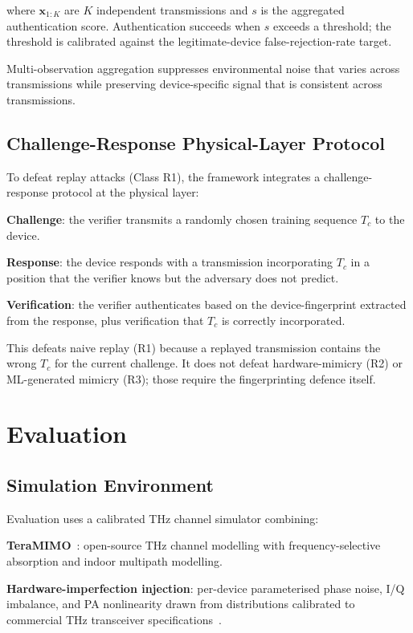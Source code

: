 \documentclass[sigconf,nonacm]{acmart}
\begin{document}
where $\mathbf{x}_{1:K}$ are $K$ independent transmissions and
$s$ is the aggregated authentication score. Authentication
succeeds when $s$ exceeds a threshold; the threshold is calibrated
against the legitimate-device false-rejection-rate target.

Multi-observation aggregation suppresses environmental noise that
varies across transmissions while preserving device-specific signal
that is consistent across transmissions.

\subsection{Challenge-Response Physical-Layer Protocol}

To defeat replay attacks (Class R1), the framework integrates a
challenge-response protocol at the physical layer:

\textbf{Challenge}: the verifier transmits a randomly chosen
training sequence $T_c$ to the device.

\textbf{Response}: the device responds with a transmission
incorporating $T_c$ in a position that the verifier knows but the
adversary does not predict.

\textbf{Verification}: the verifier authenticates based on the
device-fingerprint extracted from the response, plus verification
that $T_c$ is correctly incorporated.

This defeats naive replay (R1) because a replayed transmission
contains the wrong $T_c$ for the current challenge. It does not
defeat hardware-mimicry (R2) or ML-generated mimicry (R3); those
require the fingerprinting defence itself.

\section{Evaluation}

\subsection{Simulation Environment}

Evaluation uses a calibrated THz channel simulator combining:

\textbf{TeraMIMO}~\cite{tarboush2024teramimo}: open-source THz
channel modelling with frequency-selective absorption and indoor
multipath modelling.

\textbf{Hardware-imperfection injection}: per-device parameterised
phase noise, I/Q imbalance, and PA nonlinearity drawn from
distributions calibrated to commercial THz transceiver
specifications~\cite{singh2024thzhardware}.
\end{document}

